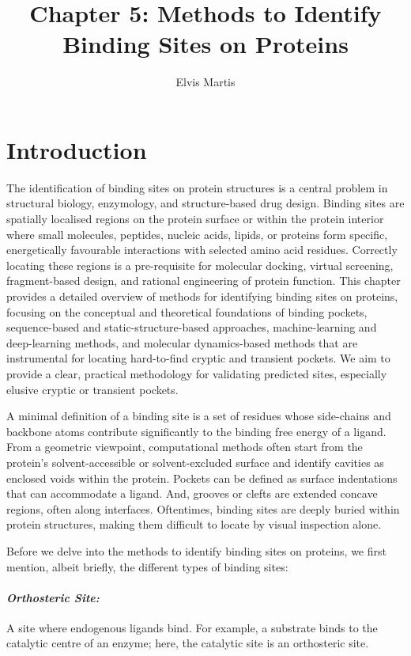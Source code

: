\documentclass[12pt]{article}
\title{Chapter 5: Methods to Identify Binding Sites on Proteins}
\author{Elvis Martis}
\date{}
\begin{document}
\maketitle


\section{Introduction}

The identification of binding sites on protein structures is a central problem in structural biology, enzymology, and structure-based drug design. Binding sites are spatially localised regions on the protein surface or within the protein interior where small molecules, peptides, nucleic acids, lipids, or proteins form specific, energetically favourable interactions with selected amino acid residues. Correctly locating these regions is a pre-requisite for molecular docking, virtual screening, fragment-based design, and rational engineering of protein function. This chapter provides a detailed overview of methods for identifying binding sites on proteins, focusing on the conceptual and theoretical foundations of binding pockets, sequence-based and static-structure-based approaches, machine-learning and deep-learning methods, and molecular dynamics-based methods that are instrumental for locating hard-to-find cryptic and transient pockets. We aim to provide a clear, practical methodology for validating predicted sites, especially elusive cryptic or transient pockets.

A minimal definition of a binding site is a set of residues whose side-chains and backbone atoms contribute significantly to the binding free energy of a ligand. From a geometric viewpoint, computational methods often start from the protein's solvent-accessible or solvent-excluded surface and identify cavities as enclosed voids within the protein. Pockets can be defined as surface indentations that can accommodate a ligand. And, grooves or clefts are extended concave regions, often along interfaces. Oftentimes, binding sites are deeply buried within protein structures, making them difficult to locate by visual inspection alone. 

Before we delve into the methods to identify binding sites on proteins, we first mention, albeit briefly, the different types of binding sites: 

\paragraph{\textit{Orthosteric Site:}} A site where endogenous ligands bind. For example, a substrate binds to the catalytic centre of an enzyme; here, the catalytic site is an orthosteric site.
\end{document}
